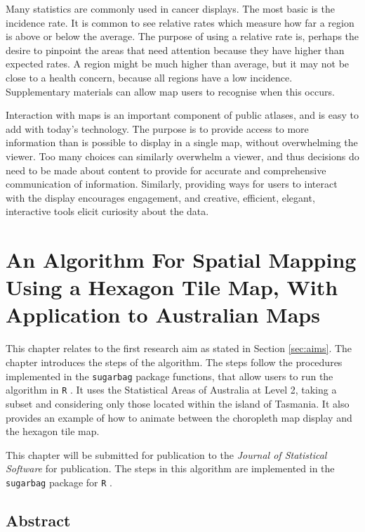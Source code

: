 \documentclass{monashthesis}
\begin{document}
Many statistics are commonly used in cancer displays. The most basic is the incidence rate. It is common to see relative rates which measure how far a region is above or below the average. The purpose of using a relative rate is, perhaps the desire to pinpoint the areas that need attention because they have higher than expected rates.
A region might be much higher than average, but it may not be close to a health concern, because all regions have a low incidence. Supplementary materials can allow map users to recognise when this occurs.

Interaction with maps is an important component of public atlases, and is easy to add with today's technology. The purpose is to provide access to more information than is possible to display in a single map, without overwhelming the viewer. Too many choices can similarly overwhelm a viewer, and thus decisions do need to be made about content to provide for accurate and comprehensive communication of information. Similarly, providing ways for users to interact with the display encourages engagement, and creative, efficient, elegant, interactive tools elicit curiosity about the data.

\hypertarget{algorithm}{%
\chapter{An Algorithm For Spatial Mapping Using a Hexagon Tile Map, With Application to Australian Maps}\label{algorithm}}

This chapter relates to the first research aim as stated in Section \ref{sec:aims}.
The chapter introduces the steps of the algorithm.
The steps follow the procedures implemented in the \texttt{sugarbag} \autocite{sugarbag} package functions, that allow users to run the algorithm in \texttt{R} \autocite{R}. It uses the Statistical Areas of Australia at Level 2, taking a subset and considering only those located within the island of Tasmania.
It also provides an example of how to animate between the choropleth map display and the hexagon tile map.

This chapter will be submitted for publication to the \emph{Journal of Statistical Software} for publication.
The steps in this algorithm are implemented in the \texttt{sugarbag} \autocite{sugarbag} package for \texttt{R} \autocite{R}.

\hypertarget{abstract-2}{%
\section*{Abstract}\label{abstract-2}}
\end{document}

